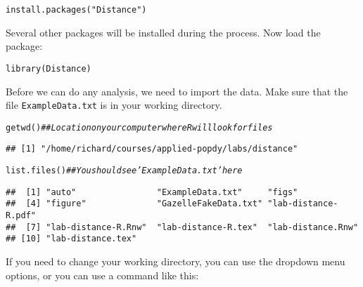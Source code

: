 \documentclass[12pt]{article}\usepackage[]{graphicx}\usepackage[]{color}
\makeatletter
\newcommand{\hlstr}[1]{\textcolor[rgb]{0.749,0.012,0.012}{#1}}%
\newcommand{\hlcom}[1]{\textcolor[rgb]{0.514,0.506,0.514}{\textit{#1}}}%
\newcommand{\hlstd}[1]{\textcolor[rgb]{0,0,0}{#1}}%
\newcommand{\hlkwd}[1]{\textcolor[rgb]{0.004,0.004,0.506}{#1}}%
\newenvironment{kframe}{%
 \def\at@end@of@kframe{}%
 \ifinner\ifhmode%
  \def\at@end@of@kframe{\end{minipage}}%
  \begin{minipage}{\columnwidth}%
 \fi\fi%
 \def\FrameCommand##1{\hskip\@totalleftmargin \hskip-\fboxsep
 \colorbox{shadecolor}{##1}\hskip-\fboxsep
     \hskip-\linewidth \hskip-\@totalleftmargin \hskip\columnwidth}%
 \MakeFramed {\advance\hsize-\width
   \@totalleftmargin\z@ \linewidth\hsize
   \@setminipage}}%
 {\par\unskip\endMakeFramed%
 \at@end@of@kframe}
\newenvironment{knitrout}{}{} %
\makeatother
\begin{document}
\begin{knitrout}
\color{fgcolor}\begin{kframe}
\begin{alltt}
\hlkwd{install.packages}\hlstd{(}\hlstr{"Distance"}\hlstd{)}
\end{alltt}
\end{kframe}
\end{knitrout}

Several other packages will be installed during the process. Now
load the package: 

\begin{knitrout}
\color{fgcolor}\begin{kframe}
\begin{alltt}
\hlkwd{library}\hlstd{(Distance)}
\end{alltt}
\end{kframe}
\end{knitrout}

Before we can do any analysis, we need to import the 
data. Make sure that the file \texttt{ExampleData.txt} is in your
working directory.

\begin{knitrout}
\color{fgcolor}\begin{kframe}
\begin{alltt}
\hlkwd{getwd}\hlstd{()}       \hlcom{## Location on your computer where R will look for files}
\end{alltt}
\begin{verbatim}
## [1] "/home/richard/courses/applied-popdy/labs/distance"
\end{verbatim}
\begin{alltt}
\hlkwd{list.files}\hlstd{()}  \hlcom{## You should see 'ExampleData.txt' here}
\end{alltt}
\begin{verbatim}
##  [1] "auto"                "ExampleData.txt"     "figs"               
##  [4] "figure"              "GazelleFakeData.txt" "lab-distance-R.pdf" 
##  [7] "lab-distance-R.Rnw"  "lab-distance-R.tex"  "lab-distance.Rnw"   
## [10] "lab-distance.tex"
\end{verbatim}
\end{kframe}
\end{knitrout}

If you need to change your working directory, you can use the dropdown
menu options, or you can use a command like this:
\end{document}
